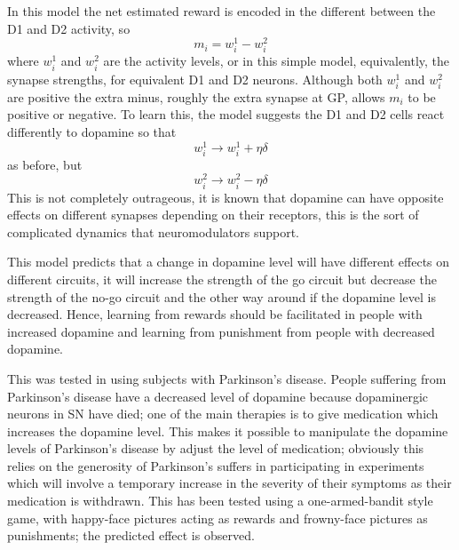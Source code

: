 \documentclass[11pt,a4paper]{scrartcl}
\begin{document}
In this model the net estimated reward is encoded in the different between the D1 and D2 activity, so
\begin{equation}
m_i=w_i^1 - w_i^2
\end{equation}
where $w_i^1$ and $w_i^2$ are the activity levels, or in this simple
model, equivalently, the synapse strengths, for equivalent D1 and D2
neurons. Although both $w_i^1$ and $w_i^2$ are positive the extra
minus, roughly the extra synapse at GP, allows $m_i$ to be positive or
negative. To learn this, the model suggests the D1 and D2 cells react
differently to dopamine so that
\begin{equation}
w_i^1\rightarrow w_i^1+\eta \delta
\end{equation}
as before, but 
\begin{equation}
w_i^2\rightarrow w_i^2-\eta \delta
\end{equation}
This is not completely outrageous, it is known that dopamine can have
opposite effects on different synapses depending on their receptors,
this is the sort of complicated dynamics that neuromodulators support.

This model predicts that a change in dopamine level will have
different effects on different circuits, it will increase the strength
of the go circuit but decrease the strength of the no-go circuit and
the other way around if the dopamine level is decreased. Hence,
learning from rewards should be facilitated in people with increased
dopamine and learning from punishment from people with decreased
dopamine.

This was tested in \cite{FrankEtAl2004a} using subjects with
Parkinson's disease. People suffering from Parkinson's disease have a
decreased level of dopamine because dopaminergic neurons in SN have
died; one of the main therapies is to give medication which increases
the dopamine level. This makes it possible to manipulate the dopamine
levels of Parkinson's disease by adjust the level of medication;
obviously this relies on the generosity of Parkinson's suffers in
participating in experiments which will involve a temporary increase
in the severity of their symptoms as their medication is
withdrawn. This has been tested using a one-armed-bandit style game,
with happy-face pictures acting as rewards and frowny-face pictures as
punishments; the predicted effect is observed.
\end{document}
